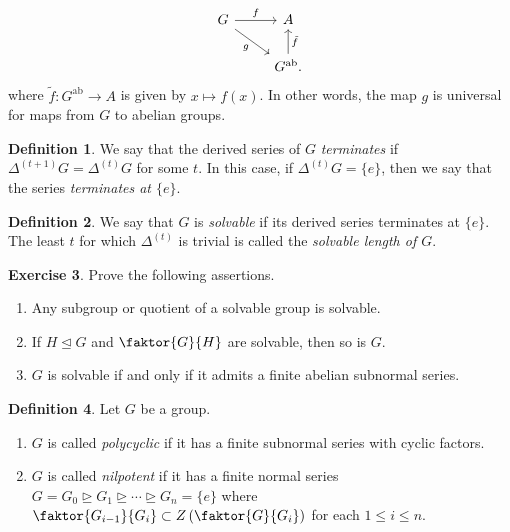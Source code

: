 \documentclass[10pt,letterpaper,cm]{nupset}
\theoremstyle{definition}
\newtheorem{definition}{Definition}[subsection]
\theoremstyle{theorem}
\newtheorem{exercise}[definition]{Exercise}
\theoremstyle{remark}
\newcommand{\1}{\mathbf{1}}
\newcommand{\0}{\vec 0}
\DeclareMathOperator{\ab}{ab}
\begin{document}
\[ \begin{tikzcd}
G \arrow[r, "f"] \arrow[dr, "g", swap] & A \\
 & G^{\ab}\arrow[u, "\tilde{f}", swap].
\end{tikzcd}
\]
where $\tilde{f}: G^{\ab} \to A$ is given by $x\mapsto f(x)$.
In other words, the map $g$ is universal for maps from $G$ to abelian groups. 


\begin{definition}
We say that the derived series of $G$ \textit{terminates} if $\Delta^{(t+1)}G = \Delta^{(t)}G$ for some $t$. In this case, if $\Delta^{(t)}G=\{e\}$, then we say that the series \textit{terminates at $\{e\}$}.
\end{definition}

\begin{definition}
We say that $G$ is \textit{solvable} if its derived series terminates at $\{e\}$. The least $t$ for which $\Delta^{(t)}$ is trivial is called the \textit{solvable length of $G$}.
\end{definition}

\begin{exercise}\label{ex7} Prove the following assertions.
\begin{enumerate}
\item Any subgroup or quotient of a solvable group is solvable.
\item If $H\unlhd G$ and $\faktor{G}{H}$ are solvable, then so is $G$.
\item $G$ is solvable  if and only if it admits a finite abelian subnormal series. 
\end{enumerate}
\end{exercise}

\begin{definition}{Let $G$ be a group.}
\begin{enumerate}
\item $G$ is called \textit{polycyclic} if it has a finite subnormal series with cyclic factors.
\item $G$ is called \textit{nilpotent} if it has a finite normal series  $G =G_0 \unrhd G_1 \unrhd \cdots \unrhd G_n = \{e\}$ where $\faktor{G_{i-1}}{G_i}\subset Z\left(\faktor{G}{G_i}\right)$ for each $1\leq i\leq n$.
\end{enumerate}
\end{definition}
\end{document}
